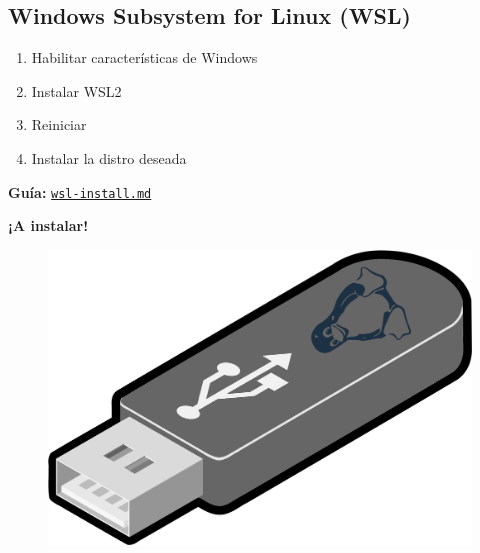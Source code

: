 \documentclass[aspectratio=43]{beamer}
\begin{document}
    \subsection{Windows Subsystem for Linux (WSL)}
    \begin{frame}[fragile]{\subsecname}{}
        \begin{enumerate}
            \item Habilitar características de Windows
            \item Instalar WSL2
            \item Reiniciar
            \item Instalar la distro deseada
        \end{enumerate}
        \bigskip
        \textbf{Guía:} \href{https://github.com/guluc3m/linux404/blob/main/wsl-install.md}{\underline{}\texttt{wsl-install.md}}
    \end{frame}


    \begin{frame}[fragile]{}{}
        \begin{center}
            \huge{\textbf{¡A instalar!}}
            \bigskip
            \begin{figure}
                \centering
                \includegraphics[width=.4\textwidth]{img/usb.png}
            \end{figure}
        \end{center}
    \end{frame}
\end{document}
